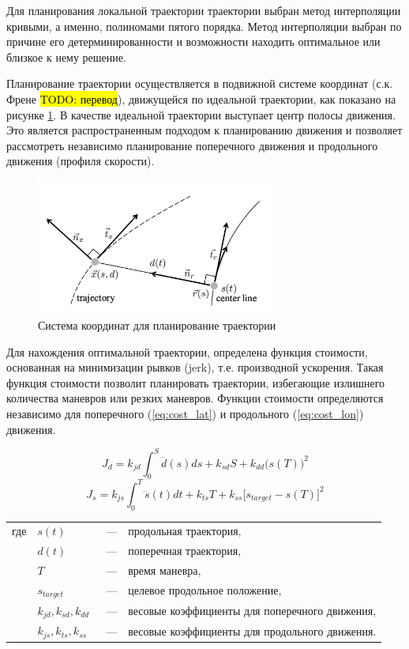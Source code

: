 Для планирования локальной траектории траектории выбран метод интерполяции кривыми, а именно, полиномами
пятого порядка. Метод интерполяции выбран по причине его детерминированности и возможности находить оптимальное
или близкое к нему решение. 

Планирование траектории осуществляется в подвижной системе координат (с.к. Френе \hl{TODO: перевод}), 
движущейся по идеальной траектории, как показано на рисунке \ref{img:junior_frenet_frame}. В качестве
идеальной траектории  выступает центр полосы движения. Это является распространенным подходом к
планированию движения и позволяет рассмотреть независимо планирование поперечного движения и
продольного движения (профиля скорости).

\begin{figure}[h]
    \centering
    \includegraphics[width=0.7\textwidth]{images/junior_frenet_frame}
    \caption{Система координат для планирование траектории}
    \label{img:junior_frenet_frame}
\end{figure}

Для нахождения оптимальной траектории, определена функция стоимости, основанная на минимизации рывков
(jerk), т.е. производной ускорения. Такая функция стоимости позволит планировать траектории, избегающие
излишнего количества маневров или резких маневров. Функции стоимости определяются независимо для
поперечного (\ref{eq:cost_lat}) и продольного (\ref{eq:cost_lon}) движения.

\begin{equation}
    \label{eq:cost_lat}
    J_d = k_{jd}\int_0^S{\dddot{d}(s)ds} + k_{sd}S + k_{dd}\big(s(T)\big)^2
\end{equation}
\begin{equation}
    \label{eq:cost_lon}
    J_s = k_{js}\int_0^T{\dddot{s}(t)dt} + k_{ts}T + k_{ss}\big[s_{target} - s(T)\big]^2
\end{equation}

\noindent\begin{tabularx}{\linewidth}{lllX}
    где & $s(t)$         &~---& продольная траектория, \\
        & $d(t)$         &~---& поперечная траектория, \\
        & $T$            &~---& время маневра, \\
        & $s_{target}$   &~---& целевое продольное положение, \\
        & $k_{jd}, k_{sd}, k_{dd}$ &~---& весовые коэффициенты для поперечного движения,\\
        & $k_{js}, k_{ts}, k_{ss}$ &~---& весовые коэффициенты для продольного движения.
\end{tabularx}

